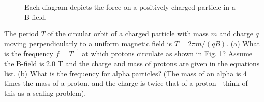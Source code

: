 \documentclass[10pt]{article}
\begin{document}
\begin{enumerate}
\begin{enumerate}
\begin{figure}[hb]
\caption{\label{fig:cyclo} Each diagram depicts the force on a positively-charged particle in a B-field.}
\end{figure}
The period $T$ of the circular orbit of a charged particle with mass $m$ and charge $q$ moving perpendicularly to a uniform magnetic field is $T = 2\pi m/(qB)$. (a) What is the frequency $f = T^{-1}$ at which protons circulate as shown in Fig. \ref{fig:cyclo}? Assume the B-field is 2.0 T and the charge and mass of protons are given in the equations list.  (b) What is the frequency for alpha particles?  (The mass of an alpha is 4 times the mass of a proton, and the charge is twice that of a proton - think of this as a scaling problem).
\end{enumerate}
\end{enumerate}
\end{document}
